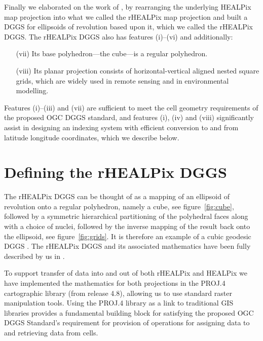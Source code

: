 \documentclass[12pt]{iopart}
\begin{document}
Finally we elaborated on the work of \citep[Section 3.1]{CaRo2007}, by rearranging the underlying HEALPix map projection into what we called the rHEALPix map projection and built a DGGS for ellipsoids of revolution based upon it, which we called the rHEALPix DGGS.
The rHEALPix DGGS also has features (i)--(vi) and additionally:
\begin{enumerate}[(i)]
    \item[(vii)] Its base polyhedron---the cube---is a regular polyhedron. 
    \item[(viii)] Its planar projection consists of horizontal-vertical aligned nested square grids, which are widely used in remote sensing and in environmental modelling.
\end{enumerate}

Features (i)--(iii) and (vii) are sufficient to meet the cell geometry requirements of the proposed OGC DGGS standard, and features (i), (iv) and (viii) significantly assist in designing an indexing system with efficient conversion to and from latitude longitude coordinates, which we describe below.

\section{Defining the rHEALPix DGGS}\label{sec:definition}

The rHEALPix DGGS can be thought of as a mapping of an ellipsoid of revolution onto a regular polyhedron, namely a cube, see figure~\ref{fig:cube}, followed by a symmetric hierarchical partitioning of the polyhedral faces along with a choice of nuclei, followed by the inverse mapping of the result back onto the ellipsoid, see figure~\ref{fig:grids}. It is therefore an example of a cubic geodesic DGGS \citep{SWK2003}. The rHEALPix DGGS and its associated mathematics have been fully described by us  in \citep{GiRa2013}. 

To support transfer of data into and out of both rHEALPix and HEALPix we have implemented the mathematics for both projections in the PROJ.4 cartographic library (from release 4.8), allowing us to use standard raster manipulation tools. Using the PROJ.4 library as a link to traditional GIS libraries provides a fundamental building block for satisfying the proposed OGC DGGS Standard's requirement for provision of operations for assigning data to and retrieving data from cells.
\end{document}
